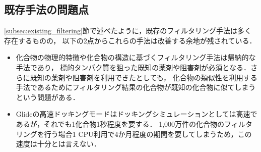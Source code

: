 \subsection{既存手法の問題点}
\ref{subsec:existing_filtering}節で述べたように，既存のフィルタリング手法は多く存在するものの，
以下の2点からこれらの手法は改善する余地が残されている．
\begin{itemize}
\item 化合物の物理的特徴や化合物の構造に基づくフィルタリング手法は帰納的な手法であり，
	標的タンパク質を狙った既知の薬剤や阻害剤が必須となる．さらに既知の薬剤や阻害剤を利用できたとしても，
	化合物の類似性を利用する手法であるためにフィルタリング結果の化合物が既知の化合物に似てしまうという問題がある．	
\item Glideの高速ドッキングモードはドッキングシミュレーションとしては高速であるが，それでも1化合物1秒程度を要する．
	1,000万件の化合物のフィルタリングを行う場合1 CPU利用で4か月程度の期間を要してしまうため，この速度は十分とは言えない．
\end{itemize}
